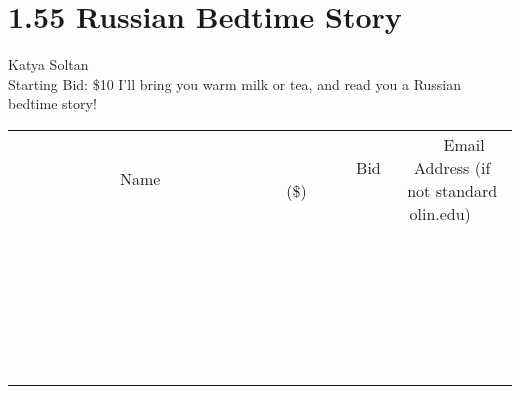 \documentclass[11pt]{article}
\begin{document}
\section*{1.55 Russian Bedtime Story}
Katya Soltan
\\
Starting Bid: \$10
\newline
I'll bring you warm milk or tea, and read you a Russian bedtime story!
\\[6ex]
\begin{tabular}{c c c}
~~~~~~~~~~~~~Name~~~~~~~~~~~~~ & ~~~~~~~~~Bid (\$)~~~~~~~~~  & ~~~Email Address (if not standard olin.edu)~~~\\
 & & \\
\hline
 & & \\
\hline
 & & \\
\hline
 & & \\
\hline
 & & \\
\hline
 & & \\
\hline
 & & \\
\hline
 & & \\
\hline
 & & \\
\hline
 & & \\
\hline
 & & \\
\hline
 & & \\
\hline
 & & \\
\hline
 & & \\
\hline
 & & \\
\hline
 & & \\
\hline
 & & \\
\hline
 & & \\
\hline
 & & \\
\hline
 & & \\
\hline
 & & \\
\hline
 & & \\
\hline
 & & \\
\hline
 & & \\
\hline
 & & \\
\hline
 & & \\
\hline
\end{tabular}
\newpage
\end{document}
